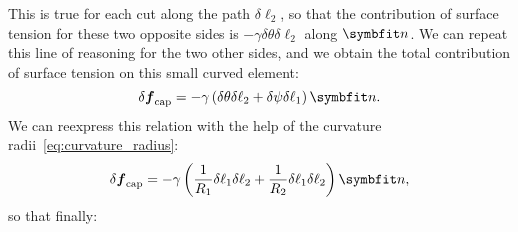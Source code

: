 This is true for each cut along the path $\delta \ell_2$, so that the contribution of surface tension for these two opposite sides is $ -\gamma \delta \theta \delta \ell_2$ along $\bn$. We can repeat this line of reasoning for the two other sides, and we obtain the total contribution of surface tension on this small curved element:
\begin{equation}
\delta \boldsymbol f_\text{cap} = - \gamma \lp \delta \theta \delta \ell_2 + \delta \psi \delta \ell_1 \rp \bn.
\end{equation}
We can reexpress this relation with the help of the curvature radii~\eqref{eq:curvature_radius}:
\begin{equation}
\delta \boldsymbol f_\text{cap} = - \gamma \lp \frac{1}{R_1}\delta \ell_1 \delta \ell_2 + \frac{1}{R_2}\delta \ell_1 \delta \ell_2 \rp \bn,
\end{equation}
so that finally:
